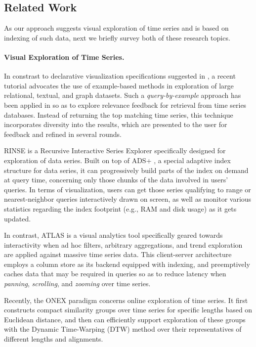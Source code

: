 \subsection{Related Work}
\label{sec:related}

As our approach suggests visual exploration of time series and is based on indexing of such data, next we briefly survey both of these research topics.
\vspace{-5pt}

\paragraph{Visual Exploration of Time Series.}
In constrast to declarative visualization specifications suggested in \cite{wu2014vldb}, a recent tutorial \cite{mottin2017vldb} advocates the use of example-based methods in exploration of large relational, textual, and graph datasets. Such a {\em query-by-example} approach has been applied in \cite{eravci2013vldb} so as to explore relevance feedback for retrieval from time series databases. Instead of returning the top matching time series, this technique incorporates diversity into the results, which are presented to the user for feedback and refined in several rounds. 

RINSE \cite{zoumpatianos2015vldb} is a Recursive Interactive Series Explorer specifically designed for exploration of data series. Built on top of ADS+ \cite{zoumpatianos2014sigmod}, a special adaptive index structure for data series, it can progressively build parts of the index on demand at query time, concerning only those chunks of the data involved in users' queries. In terms of visualization, users can get those series qualifying to range or nearest-neighbor queries interactively drawn on screen, as well as monitor various statistics regarding the index footprint (e.g., RAM and disk usage) as it gets updated.

In contrast, ATLAS \cite{chan2008vast} is a visual analytics tool specifically geared towards interactivity when ad hoc filters, arbitrary aggregations, and trend exploration are applied against massive time series data. This client-server architecture employs a column store as its backend equipped with indexing, and preemptively caches data that may be required in queries so as to reduce latency when {\em panning}, {\em scrolling}, and {\em zooming} over time series.

Recently, the ONEX paradigm \cite{neamtu2016vldb} concerns online exploration of time series. It first constructs compact similarity groups over time series for specific lengths based on Euclidean distance, and then can efficiently support exploration of these groups with the Dynamic Time-Warping (DTW) method over their representatives of different lengths and alignments.

